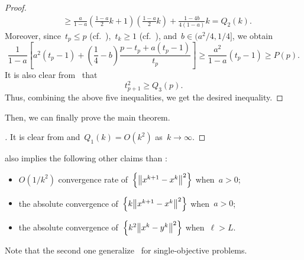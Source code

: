 \documentclass[../main]{subfiles}
\begin{document}
\begin{proof}
\begin{align}
        &\ge \frac{a}{1 - a} \left( \frac{1 - a}{2} k + 1 \right) \left( \frac{1 - a}{2} k \right) + \frac{1 - 4 b}{4 (1 - a)} k = Q_2(k)
    .\end{align}
    Moreover, since~$t_p \le p$ (cf.~),~$t_k \ge 1$ (cf.~), and~$b \in (a^2 / 4, 1 / 4]$, we obtain
    \begin{equation}
        \frac{1}{1 - a} \left[ a^2 (t_p - 1) + \left( \frac{1}{4} - b \right) \frac{p - t_p + a (t_p - 1)}{t_p} \right] \ge \frac{a^2}{1 - a} (t_p - 1) \ge P(p)
    .\end{equation} 
    It is also clear from~ that
    \begin{equation}
        t_{p + 1}^2 \ge Q_3(p)
    .\end{equation} 
    Thus, combining the above five inequalities, we get the desired inequality.
\end{proof}

Then, we can finally prove the main theorem.
\begin{proof}[]
    It is clear from  and~$Q_1(k) = O(k^2)$ as~$k \to \infty$.
\end{proof}
\begin{remark}
     also implies the following other claims than :
    \begin{itemize}
        \item $O(1 / k^2)$ convergence rate of~$\set*{\norm*{x^{k + 1} - x^k}^2}$ when~$a > 0$;
        \item the absolute convergence of~$\set*{k \norm*{x^{k + 1} - x^k}^2}$ when~$a > 0$;
        \item the absolute convergence of~$\set*{k^2 \norm*{x^k - y^k}^2}$ when~$\ell > L$.
    \end{itemize}
    Note that the second one generalize~\cite[Corollary~3.2]{Chambolle2015} for single-objective problems. 
\end{remark}
\end{document}
